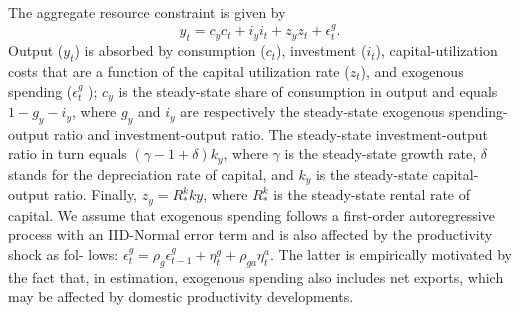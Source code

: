 \documentclass[11pt]{article}
\newcommand{\yobs}[1]{y_{#1}}
\newcommand{\cobs}[1]{c_{#1}}
\newcommand{\iobs}[1]{i_{#1}}
\newcommand{\Output}{Output}
\newcommand{\consumption}{consumption}
\newcommand{\investment}{investment}
\begin{document}
The aggregate resource constraint is given by \begin{equation}
\label{eq:1}
\yobs{t} =   c_y\cobs{t} +  i_y \iobs{t} + z_y z_t +
\epsilon^g_t.
\end{equation} \Output{} (\(\yobs{t}\)) is absorbed by \consumption{}
(\(\cobs{t}\)), \investment{} (\(\iobs{t}\)), capital-utilization costs
that are a function of the capital utilization rate (\(z_t\)), and
exogenous spending (\(\epsilon^g_t\) ); \(c_y\) is the steady-state
share of consumption in output and equals \(1- g_y -i_y\), where \(g_y\)
and \(i_y\) are respectively the steady-state exogenous spending-output
ratio and investment-output ratio. The steady-state investment-output
ratio in turn equals \((\gamma-1 +\delta)k_y\), where \(\gamma\) is the
steady-state growth rate, \(\delta\) stands for the depreciation rate of
capital, and \(k_y\) is the steady-state capital-output ratio. Finally,
\(z_y= R_*^k ky\), where \(R_*^k\) is the steady-state rental rate of
capital. We assume that exogenous spending follows a first-order
autoregressive process with an IID-Normal error term and is also
affected by the productivity shock as fol- lows:
\(\epsilon^g_t = \rho_g\epsilon^g_{t-1} + \eta_t^g +\rho_{ga}\eta_t^a\).
The latter is empirically motivated by the fact that, in estimation,
exogenous spending also includes net exports, which may be affected by
domestic productivity developments.
\end{document}
